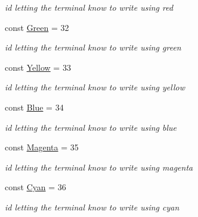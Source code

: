 \begin{DoxyCompactItemize}
\begin{DoxyCompactList}\small\item\em id letting the terminal know to write using red \end{DoxyCompactList}\item 
\mbox{\label{classDisplay_1_1Color_aeb788f34802227529b2f711246677052}} 
const \hyperlink{classDisplay_1_1Color_aeb788f34802227529b2f711246677052}{Green} = 32
\begin{DoxyCompactList}\small\item\em id letting the terminal know to write using green \end{DoxyCompactList}\item 
\mbox{\label{classDisplay_1_1Color_ade208f3dbf1e9713dbc07a3f8e45377c}} 
const \hyperlink{classDisplay_1_1Color_ade208f3dbf1e9713dbc07a3f8e45377c}{Yellow} = 33
\begin{DoxyCompactList}\small\item\em id letting the terminal know to write using yellow \end{DoxyCompactList}\item 
\mbox{\label{classDisplay_1_1Color_ac8a29dad37837402d832bc0fae4d7096}} 
const \hyperlink{classDisplay_1_1Color_ac8a29dad37837402d832bc0fae4d7096}{Blue} = 34
\begin{DoxyCompactList}\small\item\em id letting the terminal know to write using blue \end{DoxyCompactList}\item 
\mbox{\label{classDisplay_1_1Color_aa3899d6446d5ccfa3cd1ac41a91596bc}} 
const \hyperlink{classDisplay_1_1Color_aa3899d6446d5ccfa3cd1ac41a91596bc}{Magenta} = 35
\begin{DoxyCompactList}\small\item\em id letting the terminal know to write using magenta \end{DoxyCompactList}\item 
\mbox{\label{classDisplay_1_1Color_a1a7382499f34f1c74a2b66459e481ac8}} 
const \hyperlink{classDisplay_1_1Color_a1a7382499f34f1c74a2b66459e481ac8}{Cyan} = 36
\begin{DoxyCompactList}\small\item\em id letting the terminal know to write using cyan \end{DoxyCompactList}\item 

\end{DoxyCompactItemize}
